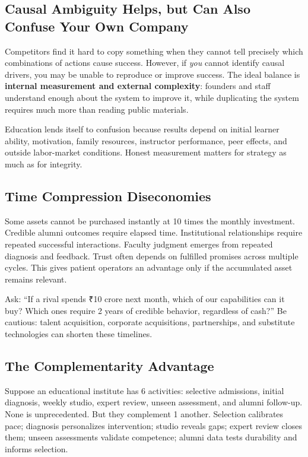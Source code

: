 \subsection{Causal Ambiguity Helps, but Can Also Confuse Your Own Company}
\label{sec:causal_ambiguity_helps_and_confuses}

Competitors find it hard to copy something when they cannot tell precisely which combinations of actions cause success. However, if \textit{you} cannot identify causal drivers, you may be unable to reproduce or improve success. The ideal balance is \textbf{internal measurement and external complexity}: founders and staff understand enough about the system to improve it, while duplicating the system requires much more than reading public materials.

Education lends itself to confusion because results depend on initial learner ability, motivation, family resources, instructor performance, peer effects, and outside labor-market conditions. Honest measurement matters for strategy as much as for integrity.

\subsection{Time Compression Diseconomies}
\label{sec:time_compression_diseconomies}

Some assets cannot be purchased instantly at 10 times the monthly investment. Credible alumni outcomes require elapsed time. Institutional relationships require repeated successful interactions. Faculty judgment emerges from repeated diagnosis and feedback. Trust often depends on fulfilled promises across multiple cycles. This gives patient operators an advantage only if the accumulated asset remains relevant.

Ask: ``If a rival spends ₹10 crore next month, which of our capabilities can it buy? Which ones require 2 years of credible behavior, regardless of cash?'' Be cautious: talent acquisition, corporate acquisitions, partnerships, and substitute technologies can shorten these timelines.

\subsection{The Complementarity Advantage}
\label{sec:complementarity_advantage}

Suppose an educational institute has 6 activities: selective admissions, initial diagnosis, weekly studio, expert review, unseen assessment, and alumni follow-up. None is unprecedented. But they complement 1 another. Selection calibrates pace; diagnosis personalizes intervention; studio reveals gaps; expert review closes them; unseen assessments validate competence; alumni data tests durability and informs selection.

